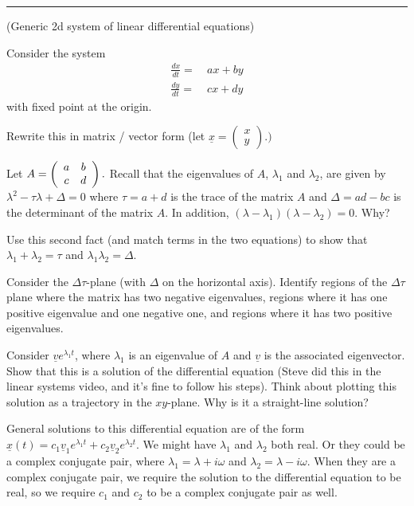 \documentclass[12pt,letterpaper,noanswers]{exam}
\begin{document}
\vspace{0.2cm}
\hrule
\vspace{0.2cm}

\begin{questions}
\item (Generic 2d system of linear differential equations) 

Consider the system 
\begin{align*}
\frac{dx}{dt} =&\ ax + by \\
\frac{dy}{dt} =&\ cx + dy
\end{align*}
with fixed point at the origin.
\begin{parts}
\item Rewrite this in matrix / vector form (let $\displaystyle \underline{x} = \left(\begin{array}{c} x \\ y \end{array}\right).)$
\item Let $\displaystyle A = \left(\begin{array}{c c} a & b \\ c & d \end{array}\right).$  Recall that the eigenvalues of $A$, $\lambda_1$ and $\lambda_2$, are given by $\lambda^2 - \tau \lambda + \Delta = 0$ where $\tau = a +d $ is the trace of the matrix $A$ and $\Delta = ad - bc$ is the determinant of the matrix $A$.  In addition, $(\lambda - \lambda_1)(\lambda-\lambda_2) = 0$.  Why?
\item Use this second fact (and match terms in the two equations) to show that $\lambda_1 + \lambda_2 = \tau$ and $\lambda_1\lambda_2 = \Delta$.
\item Consider the $\Delta\tau$-plane (with $\Delta$ on the horizontal axis).  Identify regions of the $\Delta\tau$ plane where the matrix has two negative eigenvalues, regions where it has one positive eigenvalue and one negative one, and regions where it has two positive eigenvalues.
\item Consider $\underline{v}e^{\lambda_1 t}$, where $\lambda_1$ is an eigenvalue of $A$ and $\underline{v}$ is the associated eigenvector.  Show that this is a solution of the differential equation (Steve did this in the linear systems video, and it's fine to follow his steps).  Think about plotting this solution as a trajectory in the $xy$-plane.  Why is it a straight-line solution?
\item General solutions to this differential equation are of the form $\displaystyle\underline{x}(t) = c_1\underline{v}_1e^{\lambda_1 t} + c_2\underline{v}_2e^{\lambda_2 t}$.  We might have $\lambda_1$ and $\lambda_2$ both real.  Or they could be a complex conjugate pair, where $\lambda_1 = \lambda+i\omega$ and $\lambda_2 = \lambda-i\omega$.  When they are a complex conjugate pair, we require the solution to the differential equation to be real, so we require $c_1$ and $c_2$ to be a complex conjugate pair as well.


\end{parts}
\end{questions}
\end{document}
